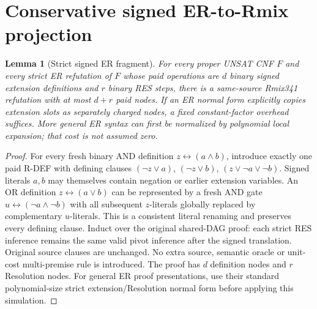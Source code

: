 \documentclass[11pt]{article}
\newtheorem{lemma}[theorem]{Lemma}
\begin{document}
\section*{Conservative signed ER-to-Rmix projection}
\begin{lemma}[Strict signed ER fragment]
For every proper UNSAT CNF \(F\) and every strict ER refutation of \(F\) whose paid operations are \(d\) binary signed extension definitions and \(r\) binary RES steps, there is a same-source Rmix341 refutation with at most \(d+r\) paid nodes. If an ER normal form explicitly copies extension slots as separately charged nodes, a fixed constant-factor overhead suffices. More general ER syntax can first be normalized by polynomial local expansion; that cost is \emph{not} assumed zero.
\end{lemma}
\begin{proof}
For every fresh binary AND definition \(z\leftrightarrow(a\wedge b)\), introduce exactly one paid R-DEF with defining clauses \((\neg z\vee a)\), \((\neg z\vee b)\), \((z\vee\neg a\vee\neg b)\). Signed literals \(a,b\) may themselves contain negation or earlier extension variables. An OR definition \(z\leftrightarrow(a\vee b)\) can be represented by a fresh AND gate \(u\leftrightarrow(\neg a\wedge\neg b)\) with all subsequent \(z\)-literals globally replaced by complementary \(u\)-literals. This is a consistent literal renaming and preserves every defining clause. Induct over the original shared-DAG proof: each strict RES inference remains the same valid pivot inference after the signed translation. Original source clauses are unchanged. No extra source, semantic oracle or unit-cost multi-premise rule is introduced. The proof has \(d\) definition nodes and \(r\) Resolution nodes. For general ER proof presentations, use their standard polynomial-size strict extension/Resolution normal form before applying this simulation.
\end{proof}
\end{document}
